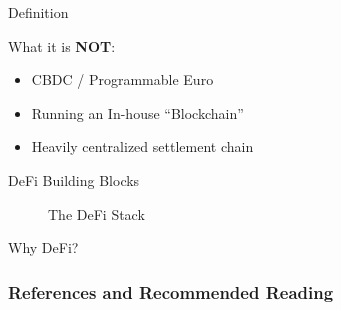 \documentclass[]{beamer}
\begin{document}


\begin{frame}{Definition}

What it is \textbf{NOT}:
	\vspace{3em}
	\begin{itemize}
		\item<2-> CBDC / Programmable Euro
		\item<3-> Running an In-house “Blockchain”
		\item<4-> Heavily centralized settlement chain
	\end{itemize}
	
\end{frame}


\begin{frame}{DeFi Building Blocks}
	\begin{figure}
	\scalebox{0.7}{
	\begin{tikzpicture}
	
	\end{tikzpicture}
	}
	\caption{The DeFi Stack \cite{FS:21}}
\end{figure}
\end{frame}


\begin{frame}{Why DeFi?}
	
	\scalebox{0.85}{
	\begin{tikzpicture}
		
		
	\end{tikzpicture}
	}
\end{frame}



\begin{frame}%
\frametitle{References and Recommended Reading}
\nocite{FS:21}
	
	
 
\end{frame}
\end{document}
